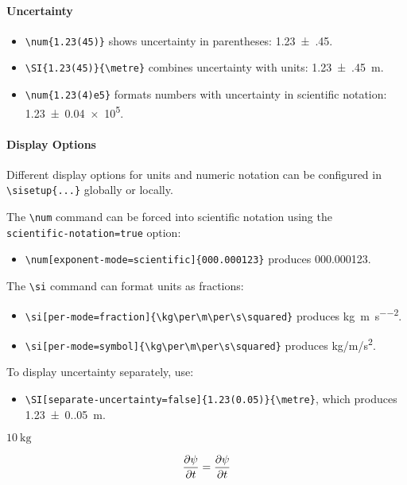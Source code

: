 \paragraph*{Uncertainty}

\begin{itemize}
    \item \verb|\num{1.23(45)}| shows uncertainty in parentheses: \num{1.23(45)}.
    \item \verb|\SI{1.23(45)}{\metre}| combines uncertainty with units: \SI{1.23(45)}{\metre}.
    \item \verb|\num{1.23(4)e5}| formats numbers with uncertainty in scientific notation: \num{1.23(4)e5}.
\end{itemize}

\paragraph*{Display Options}

Different display options for units and numeric notation can be configured in \verb|\sisetup{...}| globally or locally.

The \verb|\num| command can be forced into scientific notation using the\\
\verb|scientific-notation=true| option:

\begin{itemize}
    \item \verb|\num[exponent-mode=scientific]{000.000123}| produces \num[exponent-mode=scientific]{000.000123}.
\end{itemize}

The \verb|\si| command can format units as fractions:
\begin{itemize}
    \item \verb|\si[per-mode=fraction]{\kg\per\m\per\s\squared}| produces \si[per-mode=fraction]{\kg\per\m\per\s\squared}.
    \item \verb|\si[per-mode=symbol]{\kg\per\m\per\s\squared}| produces \si[per-mode=symbol]{\kg\per\m\per\s\squared}.
\end{itemize}

To display uncertainty separately, use:
\begin{itemize}
    \item \verb|\SI[separate-uncertainty=false]{1.23(0.05)}{\metre}|, which produces \SI[separate-uncertainty=false]{1.23(0.05)}{\metre}.
\end{itemize}







%
%

$\qty{10}{\kg}$

\begin{equation}
	\pdv{\psi}{t}
	=
	\frac{\partial \psi}{\partial t}
\end{equation}

